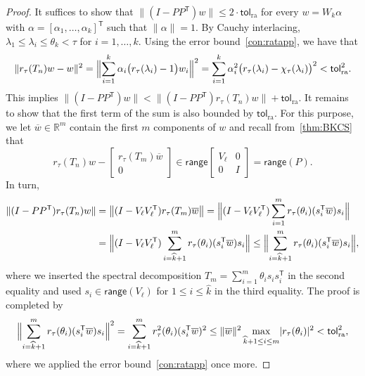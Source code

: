 \documentclass[10pt,a4paper]{amsart}
\newcommand{\R}{\mathbb{R}}
\newcommand{\Ttran}{\mathsf{T}}
\newcommand{\range}{\mathsf{range}}
\newcommand{\tol}{\mathsf{tol}}
\providecommand{\Bignorm}[1]{\Bigl\lVert#1\Bigr\rVert}
\providecommand{\abs}[1]{\lvert#1\rvert}
\providecommand{\bignorm}[1]{\bigl\lVert#1\bigr\rVert}
\providecommand{\norm}[1]{\lVert#1\rVert}
\begin{document}
\begin{proof} 
    It suffices to show that $\norm{(I-PP^{\Ttran})w}\leq 2 \cdot \tol_{\mathrm{ra}}$ for every $w = W_{k} \alpha$ with $\alpha = [\alpha_1,\ldots,\alpha_k]^\Ttran$ such that $\norm{\alpha}=1$.
    By Cauchy interlacing, $\lambda_{1}\leq \lambda_{i}\leq \theta_{k} < \tau$ for $i = 1,\ldots, k$.
    Using the error bound~\cref{con:ratapp}, we have that 
    \begin{equation*}
        \norm{r_{\tau}(T_{n})w-w}^{2} =
        \Bignorm{\sum_{i=1}^{k}\alpha_{i}\bigl(r_{\tau}(\lambda_i)-1\bigr) w_{i}}^{2} = \sum_{i=1}^{k} \alpha_{i}^{2}\bigl(r_{\tau}(\lambda_{i})-\chi_{\tau}(\lambda_{i})\bigr)^{2} <  \tol_{\mathrm{ra}}^{2}. 
    \end{equation*} 
    This implies $\norm{(I-PP^{\Ttran})w}< \norm{(I-PP^{\Ttran})r_{\tau}(T_{n})w}+\tol_{\mathrm{ra}}$. It remains to show that the first term of the sum is also bounded 
    by $\tol_{\mathrm{ra}}$. For this purpose, we let 
    $\overline{w}\in\R^{m}$ contain the first $m$ components of $w$ and 
    recall from~\cref{thm:BKCS} that
    \begin{equation*}
        r_{\tau}(T_{n})w - \begin{bmatrix}
            r_{\tau}(T_{m})\overline{w}\\0
        \end{bmatrix}\in 
            \range\begin{bmatrix}
            V_{\ell}& 0 \\ 0 & I
        \end{bmatrix}=\range(P).
    \end{equation*}
    In turn,
    \begin{equation*}
        \begin{aligned}
            \norm{(I-PP^{\Ttran})r_{\tau}(T_{n})w} &= \bignorm{(I-V_{\ell}V_{\ell}^{\Ttran})r_{\tau}(T_{m})\overline{w}} =\Bignorm{(I-V_{\ell}V_{\ell}^{\Ttran})\sum_{i=1}^{m}r_{\tau}(\theta_{i})(s_{i}^{\Ttran}\overline{w})s_{i}} \\ 
            &= \Bignorm{(I-V_{\ell}V_{\ell}^{\Ttran})\sum_{i=\widehat{k}+1}^{m}r_{\tau}(\theta_{i})(s_{i}^{\Ttran}\overline{w})s_{i}}
            \leq \Bignorm{\sum_{i=\widehat{k}+1}^{m}r_{\tau}(\theta_{i})(s_{i}^{\Ttran}\overline{w})s_{i}},
        \end{aligned}
    \end{equation*}
    where we inserted the spectral decomposition $T_{m}=\sum_{i=1}^{m}\theta_{i}s_{i}s_{i}^{\Ttran}$ in the second equality and used $s_{i}\in\range(V_{\ell})$ for $1\leq i\leq \widehat{k}$ in the third equality. The proof is completed by  
    \begin{equation*}
        \Bignorm{\sum_{i=\widehat{k}+1}^{m}r_{\tau}(\theta_{i})(s_{i}^{\Ttran}\overline{w})s_{i}}^{2}
        =\sum_{i=\widehat{k}+1}^{m}r_{\tau}^{2}(\theta_{i})(s_{i}^{\Ttran}\overline{w})^{2} \leq \norm{\overline{w}}^{2}\max_{\widehat{k}+1\leq i\leq m}\abs{r_{\tau}(\theta_{i})}^{2}
        < \tol_{\mathrm{ra}}^{2},  
    \end{equation*}
    where we applied the error bound~\cref{con:ratapp} once more. 
\end{proof}
\end{document}
